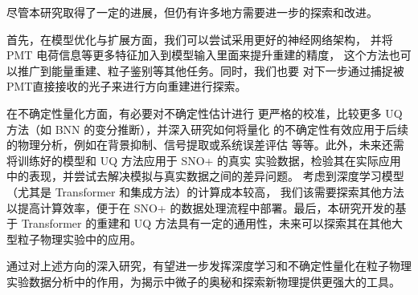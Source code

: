 尽管本研究取得了一定的进展，但仍有许多地方需要进一步的探索和改进。

首先，在模型优化与扩展方面，我们可以尝试采用更好的神经网络架构，
并将 PMT 电荷信息等更多特征加入到模型输入里面来提升重建的精度，
这个方法也可以推广到能量重建、粒子鉴别等其他任务。同时，我们也要
对下一步通过捕捉被PMT直接接收的光子来进行方向重建进行探索。

在不确定性量化方面，有必要对不确定性估计进行
更严格的校准，比较更多 UQ 方法（如 BNN 的变分推断），并深入研究如何将量化
的不确定性有效应用于后续的物理分析，例如在背景抑制、信号提取或系统误差评估
等等。此外，未来还需将训练好的模型和 UQ 方法应用于 SNO+ 的真实
实验数据，检验其在实际应用中的表现，并尝试去解决模拟与真实数据之间的差异问题。
考虑到深度学习模型（尤其是 Transformer 和集成方法）的计算成本较高，
我们该需要探索其他方法以提高计算效率，便于在 SNO+ 
的数据处理流程中部署。最后，本研究开发的基于 Transformer 的重建和 UQ 
方法具有一定的通用性，未来可以探索其在其他大型粒子物理实验中的应用。

通过对上述方向的深入研究，有望进一步发挥深度学习和不确定性量化在粒子物理实验数据分析中的作用，为揭示中微子的奥秘和探索新物理提供更强大的工具。





